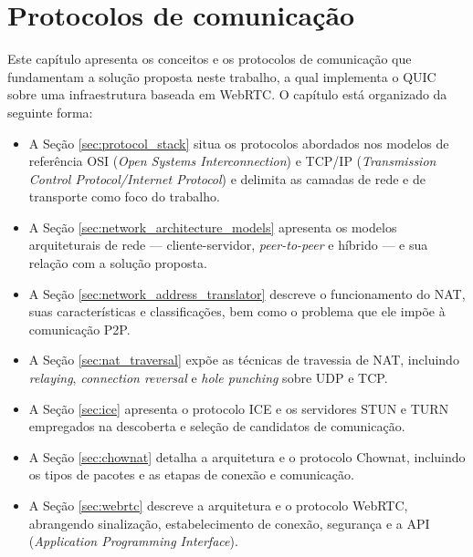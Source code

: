 \chapter{Protocolos de comunicação}
\label{chap:background}

Este capítulo apresenta os conceitos e os protocolos de comunicação que fundamentam a solução proposta neste trabalho, a qual implementa o QUIC sobre uma infraestrutura baseada em WebRTC. O capítulo está organizado da seguinte forma: 

\begin{itemize}

\item A Seção \ref{sec:protocol_stack} situa os protocolos abordados nos modelos de referência OSI (\textit{Open Systems Interconnection}) e TCP/IP (\textit{Transmission Control Protocol/Internet Protocol}) e delimita as camadas de rede e de transporte como foco do trabalho.

\item A Seção \ref{sec:network_architecture_models} apresenta os modelos arquiteturais de rede --- cliente-servidor, \textit{peer-to-peer} e híbrido --- e sua relação com a solução proposta.

\item A Seção \ref{sec:network_address_translator} descreve o funcionamento do NAT, suas características e classificações, bem como o problema que ele impõe à comunicação P2P.

\item A Seção \ref{sec:nat_traversal} expõe as técnicas de travessia de NAT, incluindo \textit{relaying}, \textit{connection reversal} e \textit{hole punching} sobre UDP e TCP.

\item A Seção \ref{sec:ice} apresenta o protocolo ICE e os servidores STUN e TURN empregados na descoberta e seleção de candidatos de comunicação.

\item A Seção \ref{sec:chownat} detalha a arquitetura e o protocolo Chownat, incluindo os tipos de pacotes e as etapas de conexão e comunicação.
\item A Seção \ref{sec:webrtc} descreve a arquitetura e o protocolo WebRTC, abrangendo sinalização, estabelecimento de conexão, segurança e a API (\textit{Application Programming Interface}).


\end{itemize}

